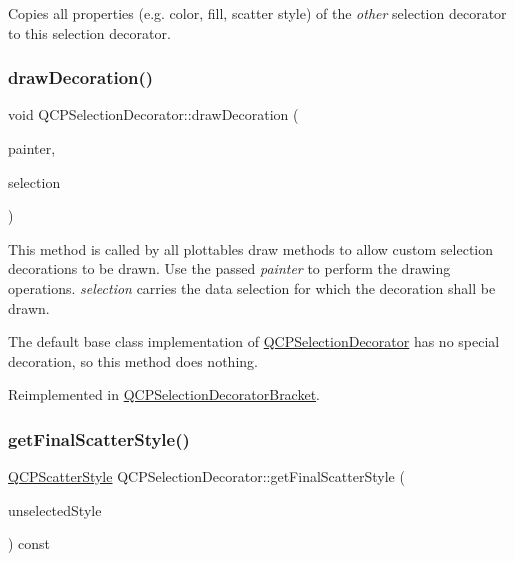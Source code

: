 Copies all properties (e.\+g. color, fill, scatter style) of the {\itshape other} selection decorator to this selection decorator. \mbox{\label{classQCPSelectionDecorator_a4f8eb49e277063845391e803ae23054a}} 
\subsubsection{\texorpdfstring{draw\+Decoration()}{drawDecoration()}}
{\footnotesize\ttfamily void Q\+C\+P\+Selection\+Decorator\+::draw\+Decoration (\begin{DoxyParamCaption}\item[{\hyperlink{classQCPPainter}{Q\+C\+P\+Painter} $\ast$}]{painter,  }\item[{\hyperlink{classQCPDataSelection}{Q\+C\+P\+Data\+Selection}}]{selection }\end{DoxyParamCaption})\hspace{0.3cm}{\ttfamily [virtual]}}

This method is called by all plottables\textquotesingle{} draw methods to allow custom selection decorations to be drawn. Use the passed {\itshape painter} to perform the drawing operations. {\itshape selection} carries the data selection for which the decoration shall be drawn.

The default base class implementation of \hyperlink{classQCPSelectionDecorator}{Q\+C\+P\+Selection\+Decorator} has no special decoration, so this method does nothing. 

Reimplemented in \hyperlink{classQCPSelectionDecoratorBracket_a9ebe2e729b5012c0a995d788f87fac22}{Q\+C\+P\+Selection\+Decorator\+Bracket}.

\mbox{\label{classQCPSelectionDecorator_a1277b373248896bc70e8cc1de96da9fa}} 
\subsubsection{\texorpdfstring{get\+Final\+Scatter\+Style()}{getFinalScatterStyle()}}
{\footnotesize\ttfamily \hyperlink{classQCPScatterStyle}{Q\+C\+P\+Scatter\+Style} Q\+C\+P\+Selection\+Decorator\+::get\+Final\+Scatter\+Style (\begin{DoxyParamCaption}\item[{const \hyperlink{classQCPScatterStyle}{Q\+C\+P\+Scatter\+Style} \&}]{unselected\+Style }\end{DoxyParamCaption}) const}

